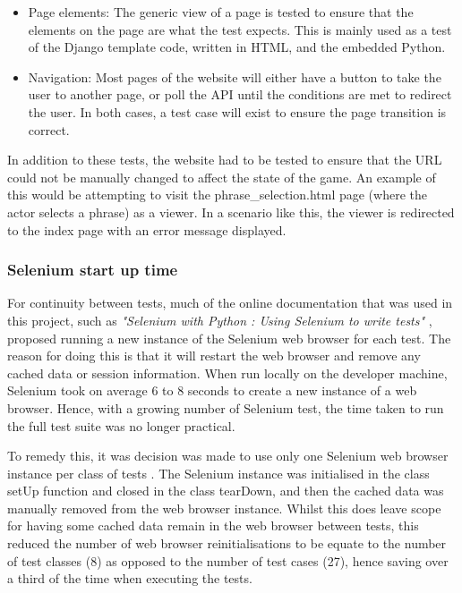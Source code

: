 \begin{itemize}
	\item Page elements: The generic view of a page is tested to ensure that the elements on the page are what the test expects. This is mainly used as a test of the Django template code, written in HTML, and the embedded Python.
	\item Navigation: Most pages of the website will either have a button to take the user to another page, or poll the API until the conditions are met to redirect the user. In both cases, a test case will exist to ensure the page transition is correct. 
\end{itemize}

In addition to these tests, the website had to be tested to ensure that the URL could not be manually changed to affect the state of the game. An example of this would be attempting to visit the phrase\_selection.html page (where the actor selects a phrase) as a viewer.  In a scenario like this, the viewer is redirected to the index page with an error message displayed.

\subsubsection{Selenium start up time}
For continuity between tests, much of the online documentation that was used in this project, such as \textit{"Selenium with Python : Using Selenium to write tests"} \cite{selenium_guide}, proposed running a new instance of the Selenium web browser for each test. The reason for doing this is that it will restart the web browser and remove any cached data or session information. When run locally on the developer machine, Selenium took on average 6 to 8 seconds to create a new instance of a web browser. Hence, with a growing number of Selenium test, the time taken to run the full test suite was no longer practical.

To remedy this, it was decision was made to use only one Selenium web browser instance per class of tests \cite{django_live_server_test}. The Selenium instance was initialised in the class setUp function and closed in the class tearDown, and then the cached data was manually removed from the web browser instance. Whilst this does leave scope for having some cached data remain in the web browser between tests, this reduced the number of web browser reinitialisations to be equate to the number of test classes (8) as opposed to the number of test cases (27), hence saving over a third of the time when executing the tests.

